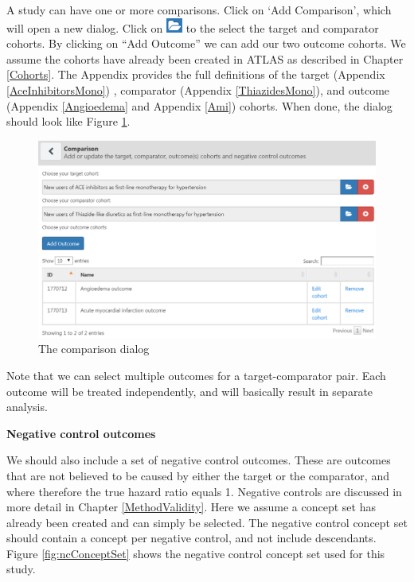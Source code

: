 \documentclass[]{book}
\begin{document}
A study can have one or more comparisons. Click on `Add Comparison',
which will open a new dialog. Click on
\includegraphics{images/PopulationLevelEstimation/open.png} to the
select the target and comparator cohorts. By clicking on ``Add Outcome''
we can add our two outcome cohorts. We assume the cohorts have already
been created in ATLAS as described in Chapter \ref{Cohorts}. The
Appendix provides the full definitions of the target (Appendix
\ref{AceInhibitorsMono}) , comparator (Appendix \ref{ThiazidesMono}),
and outcome (Appendix \ref{Angioedema} and Appendix \ref{Ami}) cohorts.
When done, the dialog should look like Figure \ref{fig:comparisons}.

\begin{figure}

{\centering \includegraphics[width=1\linewidth]{images/PopulationLevelEstimation/comparisons} 

}

\caption{The comparison dialog}\label{fig:comparisons}
\end{figure}

Note that we can select multiple outcomes for a target-comparator pair.
Each outcome will be treated independently, and will basically result in
separate analysis.

\textbf{Negative control outcomes}

We should also include a set of negative control outcomes. These are
outcomes that are not believed to be caused by either the target or the
comparator, and where therefore the true hazard ratio equals 1. Negative
controls are discussed in more detail in Chapter \ref{MethodValidity}.
Here we assume a concept set has already been created and can simply be
selected. The negative control concept set should contain a concept per
negative control, and not include descendants. Figure
\ref{fig:ncConceptSet} shows the negative control concept set used for
this study.
\end{document}
